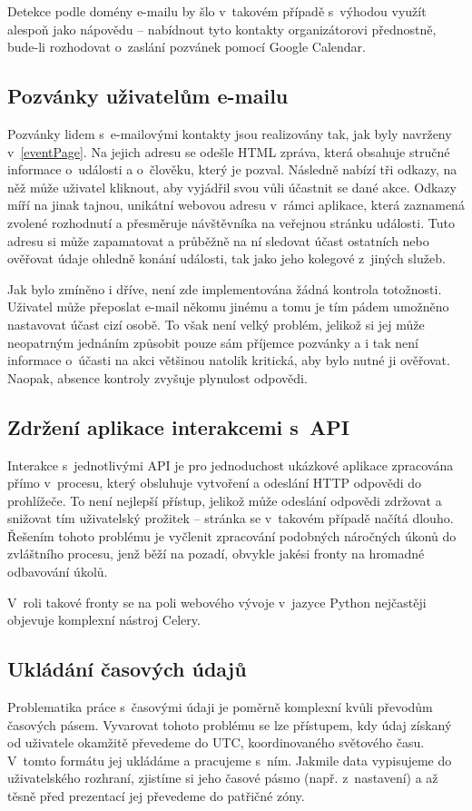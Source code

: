 \documentclass[12pt,oneside,final]{fithesis2}
\begin{document}
Detekce podle domény e-mailu by šlo v~takovém případě s~výhodou využít alespoň jako nápovědu -- nabídnout tyto kontakty organizátorovi přednostně, bude-li rozhodovat o~zaslání pozvánek pomocí Google Calendar.

\subsection{Pozvánky uživatelům e-mailu}
Pozvánky lidem s~e-mailovými kontakty jsou realizovány tak, jak byly navrženy v~\ref{eventPage}. Na jejich adresu se odešle HTML zpráva, která obsahuje stručné informace o~události a o~člověku, který je pozval. Následně nabízí tři odkazy, na něž může uživatel kliknout, aby vyjádřil svou vůli účastnit se dané akce. Odkazy míří na jinak tajnou, unikátní webovou adresu v~rámci aplikace, která zaznamená zvolené rozhodnutí a přesměruje návštěvníka na veřejnou stránku události. Tuto adresu si může zapamatovat a průběžně na ní sledovat účast ostatních nebo ověřovat údaje ohledně konání události, tak jako jeho kolegové z~jiných služeb.

Jak bylo zmíněno i dříve, není zde implementována žádná kontrola totožnosti. Uživatel může přeposlat e-mail někomu jinému a tomu je tím pádem umožněno nastavovat účast cizí osobě. To však není velký problém, jelikož si jej může neopatrným jednáním způsobit pouze sám příjemce pozvánky a i tak není informace o~účasti na akci většinou natolik kritická, aby bylo nutné ji ověřovat. Naopak, absence kontroly zvyšuje plynulost odpovědi.

\subsection{Zdržení aplikace interakcemi s~API}
Interakce s~jednotlivými API je pro jednoduchost ukázkové aplikace zpracována přímo v~procesu, který obsluhuje vytvoření a odeslání HTTP odpovědi do prohlížeče. To není nejlepší přístup, jelikož může odeslání odpovědi zdržovat a snižovat tím uživatelský prožitek -- stránka se v~takovém případě načítá dlouho. Řešením tohoto problému je vyčlenit zpracování podobných náročných úkonů do zvláštního procesu, jenž běží na pozadí, obvykle jakési fronty na hromadné odbavování úkolů.

V~roli takové fronty se na poli webového vývoje v~jazyce Python nejčastěji objevuje komplexní nástroj Celery.

\subsection{Ukládání časových údajů}
Problematika práce s~časovými údaji je poměrně komplexní kvůli převodům časových pásem. Vyvarovat tohoto problému se lze přístupem, kdy údaj získaný od uživatele okamžitě převedeme do UTC, koordinovaného světového času. V~tomto formátu jej ukládáme a pracujeme s~ním. Jakmile data vypisujeme do uživatelského rozhraní, zjistíme si jeho časové pásmo (např. z~nastavení) a až těsně před prezentací jej převedeme do patřičné zóny.
\end{document}
